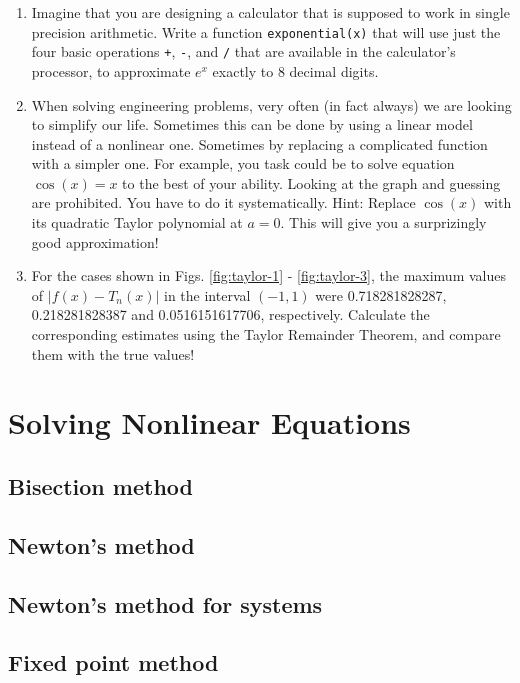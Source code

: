 \documentclass[article,A4,12pt]{llncs}
\begin{document}
\begin{enumerate}
\item Imagine that you are designing a calculator that is supposed to work in 
single precision arithmetic. Write a function {\tt exponential(x)} that will
use just the four basic operations {\tt +}, {\tt -}, {\tt *} and {\tt /} that 
are available in the calculator's processor, to approximate $e^x$ exactly to 8
decimal digits.
\item When solving engineering problems, very often (in fact always) we are 
looking to simplify our life. Sometimes this can be done by using a linear model instead of 
a nonlinear one. Sometimes by replacing a complicated function 
with a simpler one. For example, you task could be to solve equation $\cos(x) = x$
to the best of your ability. Looking at the graph and guessing are prohibited. 
You have to do it systematically. Hint: Replace $\cos(x)$ with its quadratic Taylor 
polynomial at $a = 0$. This will give you a surprizingly good approximation!
\item For the cases shown in Figs. \ref{fig:taylor-1} - \ref{fig:taylor-3}, the 
maximum values of $|f(x) - T_n(x)|$ in the interval 
$(-1, 1)$ were 0.718281828287, 0.218281828387 and 0.0516151617706, respectively.
Calculate the corresponding estimates using the Taylor Remainder Theorem, and compare
them with the true values! 
\end{enumerate}

\section{Solving Nonlinear Equations}




\subsection{Bisection method}



\subsection{Newton's method}

\subsection{Newton's method for systems}



\subsection{Fixed point method}
\end{document}
